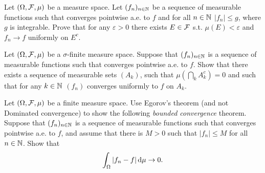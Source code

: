 \begin{problem} Let $(\Omega, \mathcal F, \mu)$ be a measure space.
Let $(f_n)_{n\in\mathbb N}$ be a sequence of measurable functions such that converges pointwise a.e. to $f$ and for all $n\in\mathbb N$ $|f_n| \leq g$, where $g$ is integrable.
 Prove that for any $\varepsilon > 0$ there exists $E\in\mathcal F$ s.t. $\mu(E) < \varepsilon$ and $f_n \to f$ uniformly on $E^c$.
\end{problem}

\begin{problem} Let $(\Omega, \mathcal F, \mu)$ be a $\sigma$-finite measure space.
Suppose that $(f_n)_{n\in\mathbb N}$ is a sequence of measurable functions such that converges pointwise a.e. to $f$.
Show that there exists a sequence of measurable sets $(A_k)$, such that $\mu \left( \bigcap_k A_k^c \right) = 0$ and such that for any $k\in\mathbb N$ $(f_n)$ converges uniformly to $f$ on $A_k$.
\end{problem}

\begin{problem} Let $(\Omega, \mathcal F, \mu)$ be a finite measure space. Use Egorov's theorem (and not Dominated convergence) to show the following \emph{bounded convergence} theorem. 
Suppose that $(f_n)_{n\in\mathbb N}$ is a sequence of measurable functions such that converges pointwise a.e. to $f$, and assume that there is $M>0$ such that $|f_n|\leq M$ for all $n\in \mathbb N$. Show that 
\begin{equation*}
    \int_\Omega|f_n-f|\,\mathrm{d} \mu \to 0.
\end{equation*}
    
\end{problem}